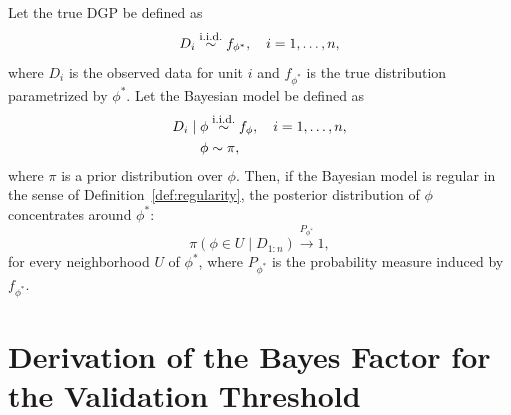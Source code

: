 \documentclass[referee,usenatbib]{biom}
\newcommand{\iid}{\overset{\text{\footnotesize i.i.d.}}{\sim}}
\begin{document}
\begin{theorem}
  Let the true DGP be defined as
  \begin{equation*}
    D_{i} \iid f_{\phi^{*}}, \quad i = 1, \ldots, n,
  \end{equation*}
  where \(D_{i}\) is the observed data for unit \(i\) and \(f_{\phi^{*}}\) is the true distribution parametrized by \(\phi^{*}\). Let the Bayesian model be defined as
  \begin{align*}
      D_{i} \mid \phi & \iid f_{\phi}, \quad i = 1, \ldots, n, \\
      \phi & \sim \pi,
  \end{align*}
  where \(\pi\) is a prior distribution over \(\phi\). Then, if the Bayesian model is regular in the sense of Definition~\ref{def:regularity}, the posterior distribution of \(\phi\) concentrates around \(\phi^{*}\):
  \begin{equation*}
    \pi \left( \phi \in U \mid D_{1:n} \right) \overset{P_{\phi^{*}}}{\to} 1,
  \end{equation*}
  for every neighborhood \(U\) of \(\phi^{*}\), where \(P_{\phi^{*}}\) is the probability measure induced by \(f_{\phi^{*}}\).
\end{theorem}

\section{Derivation of the Bayes Factor for the Validation Threshold}
\label{app:BF_derivation}
\end{document}
